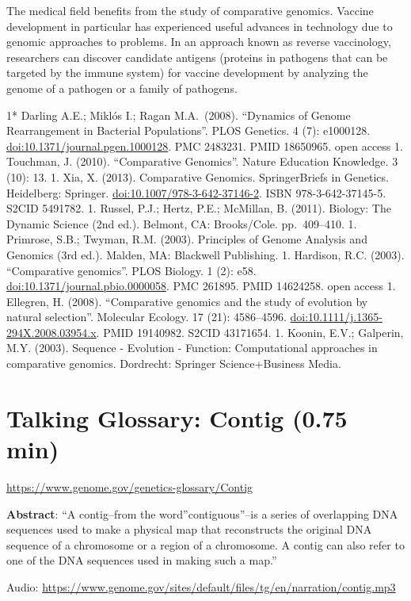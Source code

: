 \documentclass[
]{book}
\begin{document}
The medical field benefits from the study of comparative genomics. Vaccine development in particular has experienced useful advances in technology due to genomic approaches to problems. In an approach known as reverse vaccinology, researchers can discover candidate antigens (proteins in pathogens that can be targeted by the immune system) for vaccine development by analyzing the genome of a pathogen or a family of pathogens.

1* Darling A.E.; Miklós I.; Ragan M.A.~(2008). ``Dynamics of Genome Rearrangement in Bacterial Populations''. PLOS Genetics. 4 (7): e1000128. \url{doi:10.1371/journal.pgen.1000128}. PMC 2483231. PMID 18650965. open access
1. Touchman, J. (2010). ``Comparative Genomics''. Nature Education Knowledge. 3 (10): 13.
1. Xia, X. (2013). Comparative Genomics. SpringerBriefs in Genetics. Heidelberg: Springer. \url{doi:10.1007/978-3-642-37146-2}. ISBN 978-3-642-37145-5. S2CID 5491782.
1. Russel, P.J.; Hertz, P.E.; McMillan, B. (2011). Biology: The Dynamic Science (2nd ed.). Belmont, CA: Brooks/Cole. pp.~409--410.
1. Primrose, S.B.; Twyman, R.M. (2003). Principles of Genome Analysis and Genomics (3rd ed.). Malden, MA: Blackwell Publishing.
1. Hardison, R.C. (2003). ``Comparative genomics''. PLOS Biology. 1 (2): e58. \url{doi:10.1371/journal.pbio.0000058}. PMC 261895. PMID 14624258. open access
1. Ellegren, H. (2008). ``Comparative genomics and the study of evolution by natural selection''. Molecular Ecology. 17 (21): 4586--4596. \url{doi:10.1111/j.1365-294X.2008.03954.x}. PMID 19140982. S2CID 43171654.
1. Koonin, E.V.; Galperin, M.Y. (2003). Sequence - Evolution - Function: Computational approaches in comparative genomics. Dordrecht: Springer Science+Business Media.

\hypertarget{talking-glossary-contig-0.75-min}{%
\section{Talking Glossary: Contig (0.75 min)}\label{talking-glossary-contig-0.75-min}}

\url{https://www.genome.gov/genetics-glossary/Contig}

\textbf{Abstract}: ``A contig--from the word''contiguous''--is a series of overlapping DNA sequences used to make a physical map that reconstructs the original DNA sequence of a chromosome or a region of a chromosome. A contig can also refer to one of the DNA sequences used in making such a map.''

Audio: \url{https://www.genome.gov/sites/default/files/tg/en/narration/contig.mp3}
\end{document}
